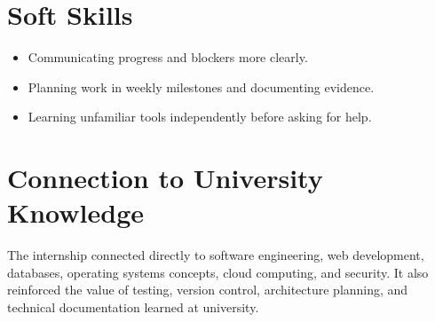 \section{Soft Skills}

\begin{itemize}
  \item Communicating progress and blockers more clearly.
  \item Planning work in weekly milestones and documenting evidence.
  \item Learning unfamiliar tools independently before asking for help.
\end{itemize}

\section{Connection to University Knowledge}

The internship connected directly to software engineering, web development,
databases, operating systems concepts, cloud computing, and security. It also
reinforced the value of testing, version control, architecture planning, and
technical documentation learned at university.